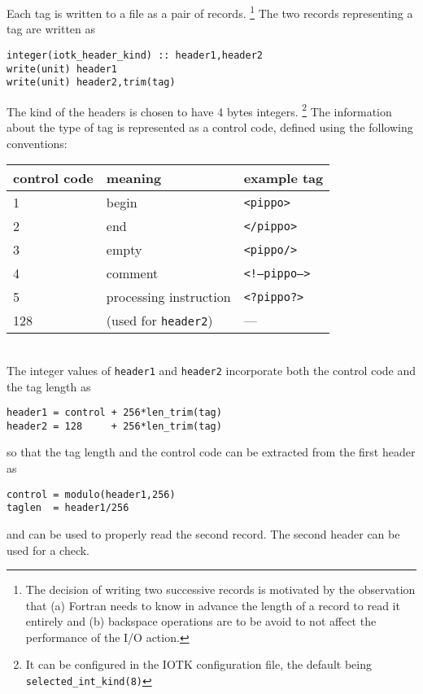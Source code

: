 \documentclass[12pt]{article}
\begin{document}
Each tag is written to a file as a pair of records.%
\footnote{The decision of writing two successive records
is motivated by the observation that (a) Fortran needs to
know in advance the length of a record to read it entirely
and (b) backspace operations are to be avoid to not
affect the performance of the I/O action.}
The two records representing a tag are written as
\begin{verbatim}
integer(iotk_header_kind) :: header1,header2
write(unit) header1
write(unit) header2,trim(tag)
\end{verbatim}
The kind of the headers is chosen to have 4 bytes integers.%
\footnote{
It can be configured in the IOTK configuration file,
the default being {\tt selected\_int\_kind(8)}}
The information about the type of tag is represented
as a control code, defined using the following
conventions:
\\[0.5cm]
\begin{tabular}{lll}
\hline
control code & meaning                & example tag \\
\hline
1            & begin                  & {\tt <pippo>} \\
2            & end                    & {\tt </pippo>} \\
3            & empty                  & {\tt <pippo/>} \\
4            & comment                & {\tt <!--pippo-->} \\
5            & processing instruction & {\tt <?pippo?>} \\
128          & (used for {\tt header2}) & --- \\
\hline
\end{tabular}
\\[0.5cm]
The integer values of {\tt header1} and {\tt header2}
incorporate both the control code and the tag length as
\begin{verbatim}
header1 = control + 256*len_trim(tag)
header2 = 128     + 256*len_trim(tag)
\end{verbatim}
so that the tag length and the control code can be
extracted from the first header as
\begin{verbatim}
control = modulo(header1,256)
taglen  = header1/256
\end{verbatim}
and can be used to properly read the second record.
The second header can be used for a check.
\end{document}
